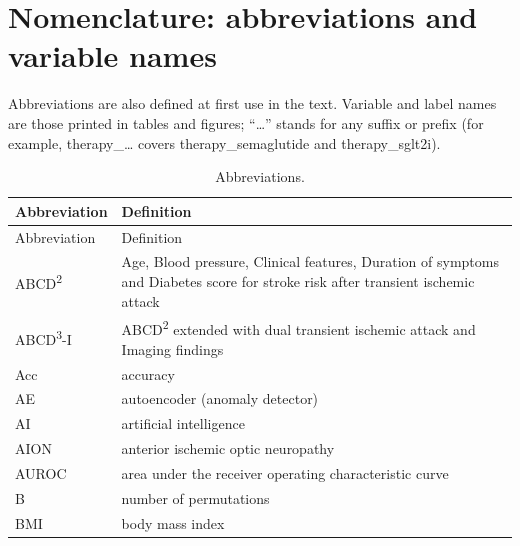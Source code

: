 \documentclass[journal]{IEEEtran}
\begin{document}
\section{Nomenclature: abbreviations and variable
names}\label{nomenclature-abbreviations-and-variable-names}

Abbreviations are also defined at first use in the text. Variable and
label names are those printed in tables and figures; ``\ldots{}'' stands
for any suffix or prefix (for example, therapy\_\ldots{} covers
therapy\_semaglutide and therapy\_sglt2i).

{\footnotesize
\begin{longtable}[]{@{}
  >{\raggedright\arraybackslash}p{}
  >{\raggedright\arraybackslash}p{}@{}}
\caption{Abbreviations.}\tabularnewline
\toprule\noalign{}
\begin{minipage}[b]{\linewidth}\raggedright
Abbreviation
\end{minipage} & \begin{minipage}[b]{\linewidth}\raggedright
Definition
\end{minipage} \\
\midrule\noalign{}
\endfirsthead
\toprule\noalign{}
\begin{minipage}[b]{\linewidth}\raggedright
Abbreviation
\end{minipage} & \begin{minipage}[b]{\linewidth}\raggedright
Definition
\end{minipage} \\
\midrule\noalign{}
\endhead
\bottomrule\noalign{}
\endlastfoot
ABCD\textsuperscript{2} & Age, Blood pressure, Clinical features, Duration of symptoms and
Diabetes score for stroke risk after transient ischemic attack \\
ABCD\textsuperscript{3}-I & ABCD\textsuperscript{2} extended with dual transient ischemic attack and Imaging
findings \\
Acc & accuracy \\
AE & autoencoder (anomaly detector) \\
AI & artificial intelligence \\
AION & anterior ischemic optic neuropathy \\
AUROC & area under the receiver operating characteristic curve \\
B & number of permutations \\
BMI & body mass index \\

\end{longtable}}
\end{document}
